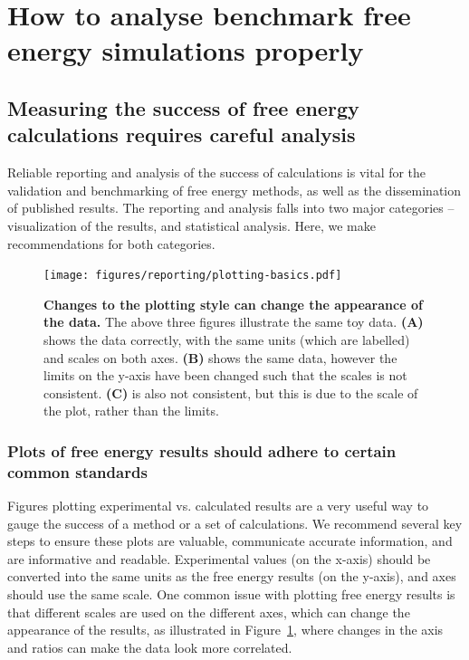 \documentclass[9pt,bestpractices,pubversion]{livecoms}
\begin{document}
\section{How to analyse benchmark free energy simulations properly}
\label{sec:analysis}

\subsection{Measuring the success of free energy calculations requires careful analysis}

Reliable reporting and analysis of the success of calculations is vital for the validation and benchmarking of free energy methods, as well as the dissemination of published results. The reporting and analysis falls into two major categories -- visualization of the results, and statistical analysis. Here, we make recommendations for both categories.

\begin{figure}
    \centering
    \texttt{[image: figures/reporting/plotting-basics.pdf]}
    \caption{\textbf{Changes to the plotting style can change the appearance of the data.} The above three figures illustrate the same toy data. \textbf{(A)} shows the data correctly, with the same units (which are labelled) and scales on both axes. \textbf{(B)} shows the same data, however the limits on the y-axis have been changed such that the scales is not consistent. \textbf{(C)} is also not consistent, but this is due to the scale of the plot, rather than the limits.}
    \label{fig:plotting-basics}
\end{figure}

\subsubsection{Plots of free energy results should adhere to certain common standards}
\label{sec:plotting_results}
Figures plotting experimental vs. calculated results are a very useful way to gauge the success of a method or a set of calculations. We recommend several key steps to ensure these plots are valuable, communicate accurate information, and are informative and readable. Experimental values (on the x-axis) should be converted into the same units as the free energy results (on the y-axis), and axes should use the same scale. One common issue with plotting free energy results is that different scales are used on the different axes, which can change the appearance of the results, as illustrated in Figure~\ref{fig:plotting-basics}, where changes in the axis and ratios can make the data look more correlated.
\end{document}
